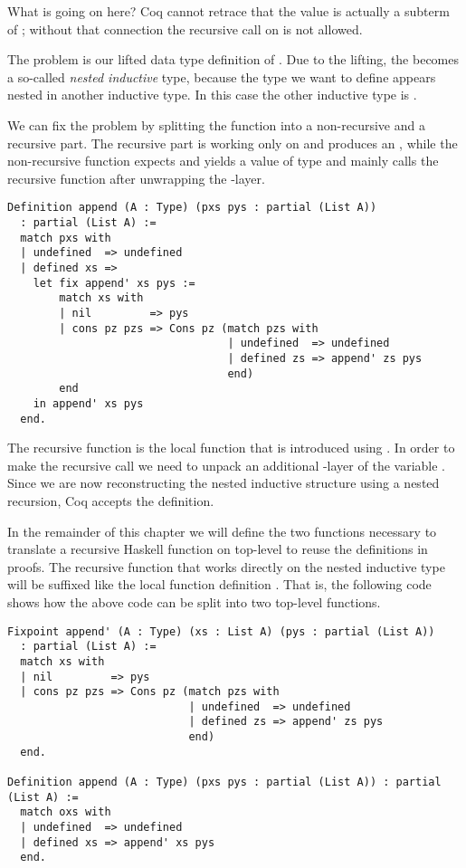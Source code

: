 What is going on here?
Coq cannot retrace that the value  is actually a subterm of ; without that connection the recursive call on  is not allowed.

The problem is our lifted data type definition of
.
Due to the lifting, the  becomes a so-called \emph{nested inductive} type, because the type we want to define
appears nested in another inductive type.
In this case the other inductive type is .

We can fix the problem by splitting the function into a non-recursive and a recursive part.
The recursive part is working only on  and produces an , while the non-recursive
function expects and yields a value of type  and mainly calls the recursive function after unwrapping the
-layer.

\begin{verbatim}
Definition append (A : Type) (pxs pys : partial (List A))
  : partial (List A) :=
  match pxs with
  | undefined  => undefined
  | defined xs =>
    let fix append' xs pys :=
        match xs with
        | nil         => pys
        | cons pz pzs => Cons pz (match pzs with
                                  | undefined  => undefined
                                  | defined zs => append' zs pys
                                  end)
        end
    in append' xs pys
  end.
\end{verbatim}

The recursive function is the local function  that is introduced using .
In order to make the recursive call we need to unpack an additional -layer of the variable .
Since we are now reconstructing the nested inductive structure using a nested recursion, Coq accepts the definition.

In the remainder of this chapter we will define the two functions necessary to translate a recursive Haskell function on top-level to reuse the definitions in proofs.
The recursive function that works directly on the nested inductive type will be suffixed like the local function definition .
That is, the following code shows how the above code can be split into two top-level functions.

\begin{verbatim}
Fixpoint append' (A : Type) (xs : List A) (pys : partial (List A))
  : partial (List A) :=
  match xs with
  | nil         => pys
  | cons pz pzs => Cons pz (match pzs with
                            | undefined  => undefined
                            | defined zs => append' zs pys
                            end)
  end.

Definition append (A : Type) (pxs pys : partial (List A)) : partial (List A) :=
  match oxs with
  | undefined  => undefined
  | defined xs => append' xs pys
  end.
\end{verbatim}

